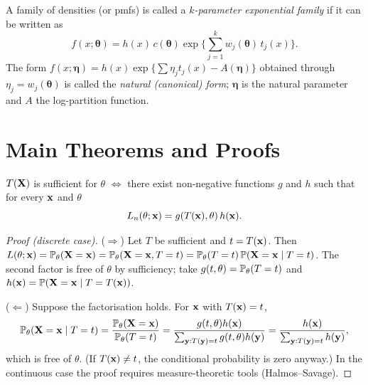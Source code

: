 \documentclass[main.tex]{subfiles}
\begin{document}
\begin{definition}\label{def:ustel-aile}
A family of densities (or pmfs) is called a \emph{$k$-parameter exponential family} if it can be written as
\[
f(x;\bm\theta)=h(x)\,c(\bm\theta)\exp\Big\{\sum_{j=1}^k w_j(\bm\theta)\,t_j(x)\Big\}.
\]
The form $f(x;\bm\eta)=h(x)\exp\{\sum\eta_jt_j(x)-A(\bm\eta)\}$ obtained through $\eta_j=w_j(\bm\theta)$ is called the \emph{natural (canonical) form}; $\bm\eta$ is the natural parameter and $A$ the log-partition function.
\end{definition}

\section{Main Theorems and Proofs}

\begin{theorem}\label{thm:faktorizasyon}
$T(\X)$ is sufficient for $\theta$ $\iff$ there exist non-negative functions $g$ and $h$ such that for every $\x$ and $\theta$
\[
L_n(\theta; \x) = g(T(\x), \theta)\, h(\x).
\]
\end{theorem}
\begin{proof}[Proof (discrete case)]
($\Rightarrow$) Let $T$ be sufficient and $t=T(\x)$. Then $L(\theta;\x)=\P_\theta(\X=\x)=\P_\theta(\X=\x,T=t)=\P_\theta(T=t)\,\P(\X=\x\mid T=t)$. The second factor is free of $\theta$ by sufficiency; take $g(t,\theta)=\P_\theta(T=t)$ and $h(\x)=\P(\X=\x\mid T=T(\x))$.

($\Leftarrow$) Suppose the factorisation holds. For $\x$ with $T(\x)=t$,
\[
\P_\theta(\X=\x\mid T=t)=\frac{\P_\theta(\X=\x)}{\P_\theta(T=t)}=\frac{g(t,\theta)h(\x)}{\sum_{\mathbf y:T(\mathbf y)=t}g(t,\theta)h(\mathbf y)}=\frac{h(\x)}{\sum_{\mathbf y:T(\mathbf y)=t}h(\mathbf y)},
\]
which is free of $\theta$. (If $T(\x)\neq t$, the conditional probability is zero anyway.) In the continuous case the proof requires measure-theoretic tools (Halmos--Savage).
\end{proof}
\end{document}
